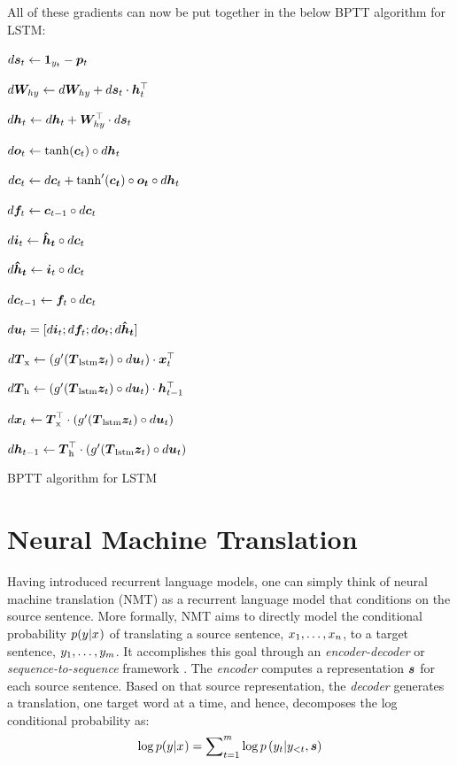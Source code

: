 All of these gradients can now be put together in the below BPTT algorithm for LSTM:
\begin{algorithm}
\label{a:lstm}
{
$d\bm{s}_{t} \leftarrow \bm{1}_{y_t} - \bm{p}_{t}$

$d\bm{W}_{hy} \leftarrow d\bm{W}_{hy} + d\bm{s}_{t} \cdot \bm{h}_{t}^\top$

$d\bm{h}_{t} \leftarrow d\bm{h}_{t} + \bm{W}_{hy}^\top \cdot d\bm{s}_{t}$

$d\bm{o}_{t} \leftarrow \tanh(\bm{c}_{t}) \circ d\bm{h}_{t}$

$d\bm{c}_{t} \leftarrow d\bm{c}_{t} + \tanh'(\bm{\bm{c}_{t}}) \circ \bm{\bm{o}_{t}} \circ d\bm{h}_{t}$ 

$d\bm{f}_{t} \leftarrow \bm{c}_{t-1} \circ d\bm{c}_{t}$

$d\bm{i}_{t} \leftarrow \mbox{\boldmath{$\hat{h}_t$}} \circ d\bm{c}_{t}$

$d\mbox{\boldmath{$\hat{h}_t$}} \leftarrow \bm{i}_{t} \circ d\bm{c}_{t}$

$d\bm{c}_{t-1} \leftarrow \bm{f}_{t} \circ d\bm{c}_{t}$ 

$d\bm{u}_t = [d\bm{i}_{t}; d\bm{f}_{t}; d\bm{o}_{t}; d\mbox{\boldmath{$\hat{h}_t$}}]$

$d\mbox{\boldmath{$T$}}_{\text{x}} \leftarrow \left(g'(\mbox{\boldmath{$T$}}_{\text{lstm}} \bm{z}_{t}) \circ d\bm{u}_t\right) \cdot \bm{x}_{t}^\top$

$d\mbox{\boldmath{$T$}}_{\text{h}} \leftarrow  \left(g'(\mbox{\boldmath{$T$}}_{\text{lstm}} \bm{z}_{t}) \circ d\bm{u}_t\right) \cdot \bm{h}_{t-1}^\top$

$d\bm{x}_{t} \leftarrow  \mbox{\boldmath{$T$}}_{\text{x}}^\top \cdot \left(g'(\mbox{\boldmath{$T$}}_{\text{lstm}} \bm{z}_{t}) \circ d\bm{u}_t\right)$

$d\bm{h}_{t-1} \leftarrow  \mbox{\boldmath{$T$}}_{\text{h}}^\top \cdot \left(g'(\mbox{\boldmath{$T$}}_{\text{lstm}} \bm{z}_{t}) \circ d\bm{u}_t\right)$
}
\caption{BPTT algorithm for LSTM}
\label{a:lstm_bptt}
\end{algorithm}

\section{Neural Machine Translation}
Having introduced recurrent language models, one can simply think of
neural machine translation (NMT) as a recurrent language model that conditions
on the source sentence. More formally, NMT aims to directly model the
conditional probability $p(y_{}|x_{})$ of translating
a source sentence, $x_{1},\ldots,x_{n}$, to a target sentence, $y_{1},\ldots,y_{m}$.
It accomplishes this goal through an {\it encoder-decoder} or {\it
sequence-to-sequence} framework
\cite{kal13,sutskever14,cho14}. The {\it encoder} computes a representation $\mbox{\boldmath{$s$}}$
for each source sentence. Based on that source representation,
the {\it decoder} generates a translation, one target word at a time, and hence,
decomposes the log conditional probability as:
\begin{equation}
\log p(y_{}|x_{}) = \sum_{t=1}^m \nolimits \log
p\left(y_{t}|y_{<t},\mbox{\boldmath{$s$}}\right)
\label{e:s2s}
\end{equation}

